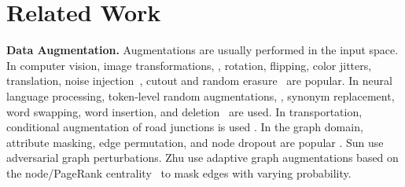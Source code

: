 
\section{Related Work}
\label{sec:relatedwork}

\noindent\textbf{Data Augmentation.} %
Augmentations are usually performed in the input space. In computer vision, image transformations, \ie, rotation, flipping, color jitters, translation,  noise injection~\citep{shorten2019survey}, cutout and random erasure~\citep{devries2017dataset} are  popular. In neural language processing, %
token-level random augmentations, \eg, synonym replacement, word swapping, word insertion, and deletion~\citep{wei2019eda} are used. In transportation, conditional augmentation of road junctions is used \cite{coltrane}. 
%
In the graph domain, %
attribute masking, edge permutation, and node dropout are popular \citep{you2020graph}. Sun \etal \cite{uai_ke} use adversarial graph perturbations. Zhu \etal \citep{zhu2021graph} use adaptive graph augmentations based on %
the node/PageRank centrality~\citep{page1999pagerank} to mask  edges with varying probability.
%

